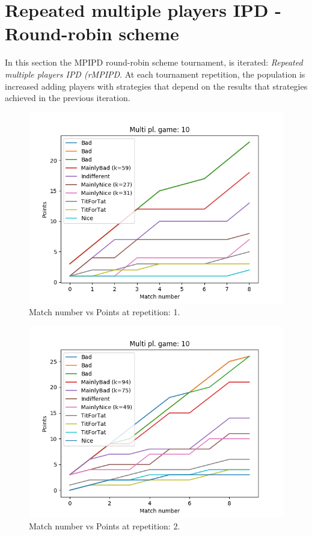 \documentclass[journal,a4paper,10pt,twoside]{IEEEtran}
\begin{document}
\newpage
\section{Repeated multiple players IPD - Round-robin scheme}
In this section the MPIPD round-robin scheme tournament, is iterated: \textit{Repeated multiple players IPD (rMPIPD}.
At each tournament repetition, the population is increased adding players with strategies that depend on the results that strategies achieved in the previous iteration. 

\begin{figure}
    \centering
    \includegraphics[width=1\columnwidth]{img_v1/ridpmp-scores-10-r0.png}
    \caption{Match number vs Points at repetition: 1.}
    \label{fig:rmpipd1}
\end{figure}

\begin{figure}
    \centering
    \includegraphics[width=1\columnwidth]{img_v1/ridpmp-scores-10-r1.png}
    \caption{Match number vs Points at repetition: 2.}
    \label{fig:rmpipd2}
\end{figure}
\end{document}

